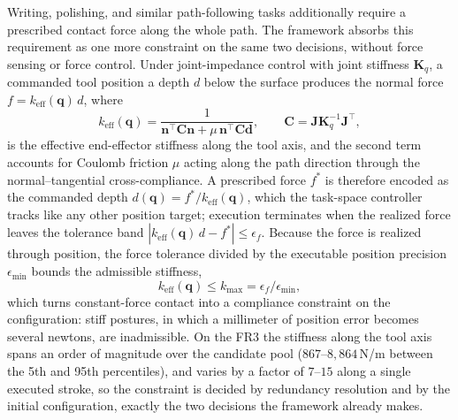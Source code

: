 \documentclass[journal, twoside]{IEEEtran}
\begin{document}
Writing, polishing, and similar path-following tasks additionally require
a prescribed contact force along the whole path. The framework absorbs
this requirement as one more constraint on the same two decisions,
without force sensing or force control. Under joint-impedance control
with joint stiffness $\mathbf{K}_{q}$, a commanded tool position a depth
$d$ below the surface produces the normal force
$f=k_{\mathrm{eff}}(\mathbf{q})\,d$, where
\begin{equation}
\label{eq:keff}
k_{\mathrm{eff}}(\mathbf{q})
=
\frac{1}{\mathbf{n}^{\top}\mathbf{C}\mathbf{n}
+\mu\,\mathbf{n}^{\top}\mathbf{C}\mathbf{d}},
\qquad
\mathbf{C}=\mathbf{J}\mathbf{K}_{q}^{-1}\mathbf{J}^{\top},
\end{equation}
is the effective end-effector stiffness along the tool axis, and the
second term accounts for Coulomb friction $\mu$ acting along the path
direction through the normal--tangential cross-compliance. A prescribed
force $f^{\ast}$ is therefore encoded as the commanded depth
$d(\mathbf{q})=f^{\ast}/k_{\mathrm{eff}}(\mathbf{q})$, which the
task-space controller tracks like any other position target; execution
terminates when the realized force leaves the tolerance band
$|k_{\mathrm{eff}}(\mathbf{q})\,d-f^{\ast}|\leq\epsilon_{f}$. Because the
force is realized through position, the force tolerance divided by the
executable position precision $\epsilon_{\min}$ bounds the admissible
stiffness,
\begin{equation}
\label{eq:kcap}
k_{\mathrm{eff}}(\mathbf{q})\leq k_{\max}=\epsilon_{f}/\epsilon_{\min},
\end{equation}
which turns constant-force contact into a compliance constraint on the
configuration: stiff postures, in which a millimeter of position error
becomes several newtons, are inadmissible. On the FR3 the stiffness along
the tool axis spans an order of magnitude over the candidate pool
($867$--$8{,}864$\,N/m between the 5th and 95th percentiles), and varies by
a factor of $7$--$15$ along a single executed stroke, so the constraint
is decided by redundancy resolution and by the initial configuration,
exactly the two decisions the framework already makes.
\end{document}
